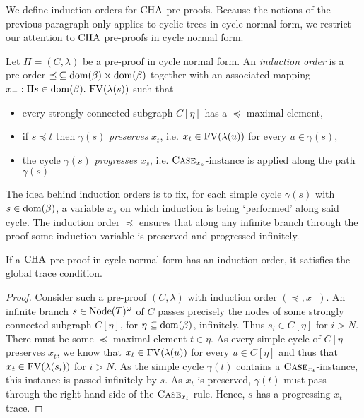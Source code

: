 We define induction orders for $\mathrm{CHA}$ pre-proofs. Because the notions
of the previous paragraph only applies to cyclic trees in cycle normal form, we
restrict our attention to $\mathrm{CHA}$ pre-proofs in cycle normal form.

\begin{definition}\label{def:io}
  Let $\Pi = (C, \lambda)$ be a pre-proof in cycle normal form.
  An \emph{induction order} is a pre-order
  $\mathrel{\preceq}\: \subseteq
  \mathrm{dom}(\beta) \times \mathrm{dom} (\beta) $ together with an associated mapping $x_{-} : \Pi s \in \mathrm{dom}(\beta).~\mathrm{FV}(\lambda(s))$
  such that
  \begin{itemize}
  \item every strongly connected subgraph $C[\eta]$ has a
    $\preceq$-maximal element,
  \item if $s \preceq t$ then $\gamma(s)$ \emph{preserves} $x_t$, i.e. $x_t \in
    \mathrm{FV}(\lambda(u))$ for every $u \in \gamma(s)$,
  \item the cycle $\gamma(s)$ \emph{progresses} $x_s$, i.e.
    $\textsc{Case}_{x_s}$-instance is applied along the path $\gamma(s)$
  \end{itemize}
\end{definition}

The idea behind induction orders is to fix, for each simple cycle $\gamma(s)$
with $s \in \mathrm{dom}(\beta)$, a variable $x_s$ on which induction is being
`performed' along said cycle. The induction order $\preceq$ ensures that along
any infinite branch through the proof
some induction variable is preserved and progressed infinitely.

\begin{theorem}\label{lem:io-correct}
  If a $\mathrm{CHA}$ pre-proof in cycle normal form has an induction order, it
  satisfies the global trace condition.
\end{theorem}
\begin{proof}
  Consider such a pre-proof $(C, \lambda)$ with induction order $(\preceq,
  x_{-})$. An infinite branch $s \in \mathrm{Node}(T)^\omega$ of $C$ passes precisely
  the nodes of some
  strongly connected subgraph $C[\eta]$, for $\eta \subseteq \mathrm{dom}(\beta)$, infinitely.
  Thus $s_i \in C[\eta]$ for $i > N$. There must be some $\preceq$-maximal
  element $t \in \eta$. As every simple cycle of $C[\eta]$ preserves $x_t$, we
  know that $x_t \in \mathrm{FV}(\lambda(u))$ for every $u \in C[\eta]$ and thus that
  $x_t \in \mathrm{FV}(\lambda(s_i))$ for $i > N$. As the simple cycle $\gamma(t)$
  contains a $\textsc{Case}_{x_t}$-instance, this instance is passed infinitely by $s$.
  As $x_t$ is preserved, $\gamma(t)$ must pass through the right-hand side of
  the $\textsc{Case}_{x_t}$ rule. Hence, $s$ has a progressing $x_t$-trace.
\end{proof}

